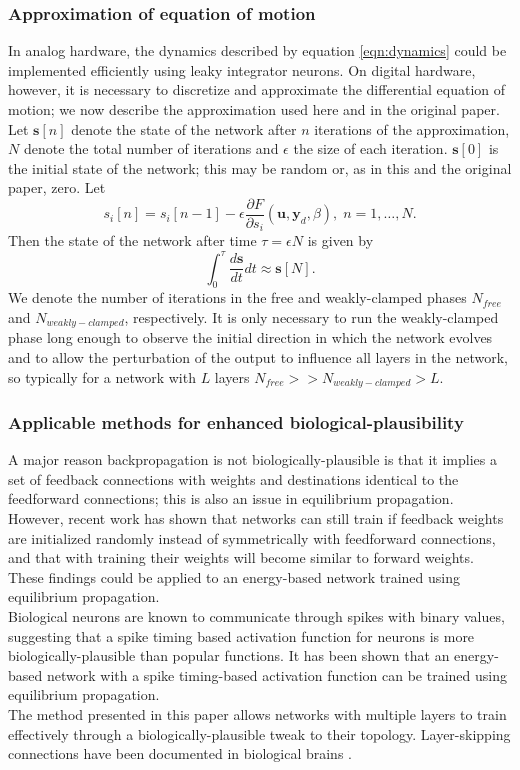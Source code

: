 \documentclass[format=sigconf]{acmart}
\newcommand{\mtx}[1]{\bm{#1}}
\newcommand{\npar}{\\\indent}
\begin{document}
\subsubsection{Approximation of equation of motion}

In analog hardware, the dynamics described by equation \ref{eqn:dynamics} could be implemented efficiently using leaky integrator neurons. On digital hardware, however, it is necessary to discretize and approximate the differential equation of motion; we now describe the approximation used here and in the original paper. Let $\mtx{s}[n]$ denote the state of the network after $n$ iterations of the approximation, $N$ denote the total number of iterations and $\epsilon$ the size of each iteration. $\mtx{s}[0]$ is the initial state of the network; this may be random or, as in this and the original paper, zero.  Let 
 \begin{equation}
 s_i[n]=s_i[n-1]-\epsilon \frac{\partial F}{\partial s_i}(\mtx{u},\mtx{y}_d,\beta),\;n=1,\hdots,N.
 \end{equation}
 Then the state of the network after time $\tau=\epsilon N$ is given by
\begin{equation}
\int_0^\tau\frac{d\mtx{s}}{dt}dt\approx \mtx{s}[N].
\end{equation}
 We denote the number of iterations in the free and weakly-clamped phases $N_{free}$ and $N_{weakly-clamped}$, respectively. It is only necessary to run the weakly-clamped phase long enough to observe the initial direction in which the network evolves and to allow the perturbation of the output to influence all layers in the network, so typically for a network with $L$ layers $N_{free}>>N_{weakly-clamped}>L$.
 
\subsubsection{Applicable methods for enhanced biological-plausibility}

A major reason backpropagation is not biologically-plausible is that it implies a set of feedback connections with weights and destinations identical to the feedforward connections; this is also an issue in equilibrium propagation. However, recent work \cite{lillicrap2014} has shown that networks can still train if feedback weights are initialized randomly instead of symmetrically with feedforward connections, and that with training their weights will become similar to forward weights. These findings could be applied to an energy-based network trained using equilibrium propagation.
\npar
Biological neurons are known to communicate through spikes with binary values, suggesting that a spike timing based activation function for neurons is more biologically-plausible than popular functions. It has been shown \cite{oconnor2018} that an energy-based network with a spike timing-based activation function can be trained using equilibrium propagation.
\npar
The method presented in this paper allows networks with multiple layers to train effectively through a biologically-plausible tweak to their topology. Layer-skipping connections have been documented in biological brains \cite{bullmore2009}.
\end{document}
